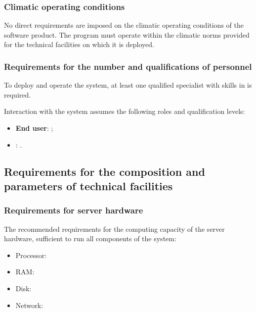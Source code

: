 \documentclass[12pt,a4paper]{extarticle}
\begin{document}
\subsubsection{Climatic operating conditions}

No direct requirements are imposed on the climatic operating conditions of the software product. The program must operate within the climatic norms provided for the technical facilities on which it is deployed.

\subsubsection{Requirements for the number and qualifications of personnel}

To deploy and operate the system, at least one qualified specialist with skills in  is required.

Interaction with the system assumes the following roles and qualification levels:
\begin{itemize}[nosep, leftmargin=1.25cm]
    \item \textbf{End user}: ;
    \item \textbf{}: .
\end{itemize}

\subsection{Requirements for the composition and parameters of technical facilities}

\subsubsection{Requirements for server hardware}
\label{sec:server_hardware}

The recommended requirements for the computing capacity of the server hardware, sufficient to run all components of the system:

\begin{itemize}[leftmargin=1.25cm]
\item Processor: 
\item RAM: 
\item Disk: 
\item Network: 
\end{itemize}
\end{document}
